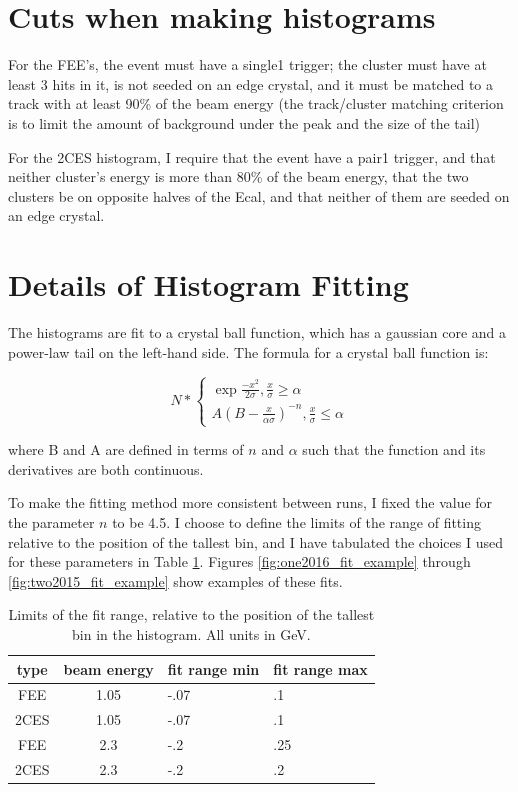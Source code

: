 \documentclass[11pt]{article}
\begin{document}
\section{Cuts when making histograms}

For the FEE's, the event must have a single1 trigger; the cluster must have at least 3 hits in it, is not seeded on an edge crystal, and it must be matched to a track with at least 90\% of the beam energy (the track/cluster matching criterion is to limit the amount of background under the peak and the size of the tail)

For the 2CES histogram, I require that the event have a pair1 trigger, and that neither cluster's energy is more than 80\% of the beam energy, that the two clusters be on opposite halves of the Ecal, and that neither of them are seeded on an edge crystal.   

\section{Details of Histogram Fitting}
The histograms are fit to a crystal ball function, which has a gaussian core and a power-law tail on the left-hand side.   The formula for a crystal ball function is:

\begin{equation}
N*\begin{cases}
\exp{\frac{-x^2}{2\sigma}},  \frac{x}{\sigma} \ge \alpha\\
A\left(B-\frac{x}{\alpha\sigma}\right)^{-n}, \frac{x}{\sigma} \le \alpha
\end{cases}
\label{eq:crystalball}
\end{equation}

where B and A are defined in terms of $n$ and $\alpha$ such that the function and its derivatives are both continuous.

To make the fitting method more consistent between runs, I fixed the value for the parameter $n$ to be 4.5.    I choose to define the limits of the range of fitting relative to the position of the tallest bin, and I have tabulated the choices I used for these parameters in Table \ref{tab:fit_range_limits}.  Figures \ref{fig:one2016_fit_example} through \ref{fig:two2015_fit_example} show examples of these fits.  


\begin{table}[htp]
\caption{Limits of the fit range, relative to the position of the tallest bin in the histogram.  All units in GeV.}
\begin{center}
\begin{tabular}{|c|c|l|l|}
\hline
type & beam energy & fit range min & fit range max \\
\hline
FEE & 1.05 & -.07 & .1 \\
2CES & 1.05 & -.07 & .1 \\ 
FEE & 2.3 & -.2 & .25 \\
2CES & 2.3 & -.2 & .2 \\

\hline
\end{tabular}
\end{center}
\label{tab:fit_range_limits}
\end{table}%
\end{document}
